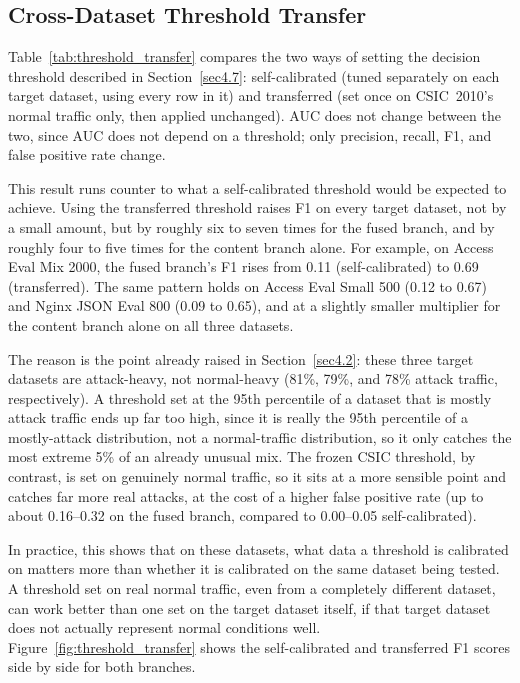 \documentclass[futureinternet,article,submit,moreauthors]{Definitions/mdpi}
\begin{document}
\subsection{Cross-Dataset Threshold Transfer} \label{sec5.4}

Table~\ref{tab:threshold_transfer} compares the two ways of setting the decision threshold described in Section~\ref{sec4.7}: self-calibrated (tuned separately on each target dataset, using every row in it) and transferred (set once on CSIC~2010's normal traffic only, then applied unchanged). AUC does not change between the two, since AUC does not depend on a threshold; only precision, recall, F1, and false positive rate change.

This result runs counter to what a self-calibrated threshold would be expected to achieve. Using the transferred threshold raises F1 on every target dataset, not by a small amount, but by roughly six to seven times for the fused branch, and by roughly four to five times for the content branch alone. For example, on Access Eval Mix 2000, the fused branch's F1 rises from 0.11 (self-calibrated) to 0.69 (transferred). The same pattern holds on Access Eval Small 500 (0.12 to 0.67) and Nginx JSON Eval 800 (0.09 to 0.65), and at a slightly smaller multiplier for the content branch alone on all three datasets.

The reason is the point already raised in Section~\ref{sec4.2}: these three target datasets are attack-heavy, not normal-heavy (81\%, 79\%, and 78\% attack traffic, respectively). A threshold set at the 95th percentile of a dataset that is mostly attack traffic ends up far too high, since it is really the 95th percentile of a mostly-attack distribution, not a normal-traffic distribution, so it only catches the most extreme 5\% of an already unusual mix. The frozen CSIC threshold, by contrast, is set on genuinely normal traffic, so it sits at a more sensible point and catches far more real attacks, at the cost of a higher false positive rate (up to about 0.16--0.32 on the fused branch, compared to 0.00--0.05 self-calibrated).

In practice, this shows that on these datasets, what data a threshold is calibrated on matters more than whether it is calibrated on the same dataset being tested. A threshold set on real normal traffic, even from a completely different dataset, can work better than one set on the target dataset itself, if that target dataset does not actually represent normal conditions well. Figure~\ref{fig:threshold_transfer} shows the self-calibrated and transferred F1 scores side by side for both branches.
\end{document}

